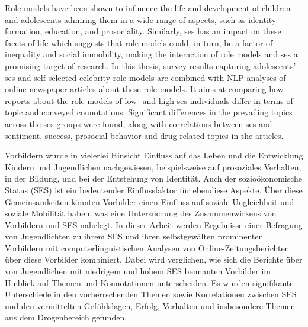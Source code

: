 Role models have been shown to influence the life and development of children and adolescents admiring them in a wide range of aspects, such as identity formation, education, and prosociality. Similarly, \gls{ses} has an impact on these facets of life which suggests that role models could, in turn, be a factor of inequality and social immobility, making the interaction of role models and \gls{ses} a promising target of research. In this thesis, survey results capturing adolescents' \gls{ses} and self-selected celebrity role models are combined with NLP analyses of online newspaper articles about these role models. It aims at comparing how reports about the role models of low- and high-\gls{ses} individuals differ in terms of topic and conveyed connotations. Significant differences in the prevailing topics across the \gls{ses} groups were found, along with correlations between \gls{ses} and sentiment, success, prosocial behavior and drug-related topics in the articles.

\vspace{2cm}
Vorbildern wurde in vielerlei Hinsicht Einfluss auf das Leben und die Entwicklung Kindern und Jugendlichen nachgewiesen, beispielsweise auf prosoziales Verhalten, in der Bildung, und bei der Entstehung von Identität. Auch der sozioökonomische Status (SES) ist ein bedeutender Einflussfaktor für ebendiese Aspekte. Über diese Gemeinsamkeiten könnten Vorbilder einen Einfluss auf soziale Ungleichheit und soziale Mobilität haben, was eine Untersuchung des Zusammenwirkens von Vorbildern und SES nahelegt. In dieser Arbeit werden Ergebnisse einer Befragung von Jugendlichten zu ihrem SES und ihren selbstgewälten prominenten Vorbildern mit computerlinguistischen Analysen von Online-Zeitungsberichten über diese Vorbilder kombiniert. Dabei wird verglichen, wie sich die Berichte über von Jugendlichen mit niedrigem und hohem SES bennanten Vorbilder im Hinblick auf Themen und Konnotationen unterscheiden. Es wurden signifikante Unterschiede in den vorherrschenden Themen sowie Korrelationen zwischen SES und den vermittelten Gefühlslagen, Erfolg, Verhalten und insbesondere Themen aus dem Drogenbereich gefunden.

\glsresetall